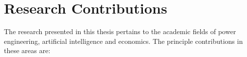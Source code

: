 


\section{Research Contributions}
The research presented in this thesis pertains to the academic fields of power
engineering, artificial intelligence and economics.  The principle
contributions in these areas are:

